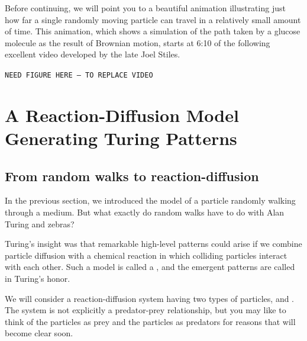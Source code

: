 Before continuing, we will point you to a beautiful animation illustrating just how far a single randomly moving particle can travel in a relatively small amount of time. This animation, which shows a simulation of the path taken by a glucose molecule as the result of Brownian motion, starts at 6:10 of the following excellent video developed by the late Joel Stiles.

\texttt{NEED FIGURE HERE -- TO REPLACE VIDEO}\\

















\FloatBarrier
{}

\section{A Reaction-Diffusion Model Generating Turing Patterns}
\label{sec:a_reaction-diffusion_model_generating_turing_patterns}

\subsection{From random walks to reaction-diffusion}

In the previous section, we introduced the model of a particle randomly walking through a medium. But what exactly do random walks have to do with Alan Turing and zebras?

Turing's insight was that remarkable high-level patterns could arise if we combine particle diffusion with a chemical reaction in which colliding particles interact with each other. Such a model is called a , and the emergent patterns are called  in Turing's honor.

We will consider a reaction-diffusion system having two types of particles,  and . The system is not explicitly a predator-prey relationship, but you may like to think of the  particles as prey and the  particles as predators for reasons that will become clear soon.

